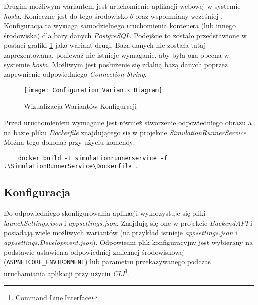 \par Drugim możliwym wariantem jest uruchomienie aplikacji webowej w systemie \emph{host}a. Konieczne jest do tego środowisko \emph{\dotnet{} 6} oraz wspomniany wcześniej \emph{\docker{}}. Konfiguracja ta wymaga samodzielnego uruchomienia kontenera (lub innego środowiska) dla bazy danych \emph{PostgreSQL}. Podejście to zostało przedstawione w postaci grafiki \ref{fig:wizualizacjaWariantowKonfiguracji} jako wariant drugi. Baza danych nie została tutaj zaprezentowana, ponieważ nie istnieje wymaganie, aby była ona obecna w systemie \emph{host}a. Możliwym jest posłużenie się zdalną bazą danych poprzez zapewnienie odpowiedniego \emph{Connection String}.

\begin{figure}[H]
	\texttt{[image: Configuration Variants Diagram]}
	\caption{Wizualizacja Wariantów Konfiguracji}
	\label{fig:wizualizacjaWariantowKonfiguracji}
\end{figure}

\par Przed uruchomieniem wymagane jest również stworzenie odpowiedniego obrazu \emph{\docker{}}a na bazie pliku \emph{Dockerfile} znajdującego się w projekcie \emph{SimulationRunnerService}. Można tego dokonać przy użyciu komendy:

\begin{lstlisting}
	docker build -t simulationrunnerservice -f .\SimulationRunnerService\Dockerfile .
\end{lstlisting}

\subsection{Konfiguracja}
\label{subsec:konfiguracja}

\par Do odpowiedniego skonfigurowania aplikacji wykorzystuje się pliki \emph{launchSettings.json} i \emph{appsettings.json}. Znajdują się one w projekcie \emph{BackendAPI} i posiadają wiele możliwych wariantów (na przykład istnieje \emph{appsettings.json} i \emph{appsettings.Development.json}). Odpowiedni plik konfiguracyjny jest wybierany na podstawie ustawienia odpowiedniej zmiennej środowiskowej (\texttt{ASPNETCORE\_ENVIRONMENT}) lub parametru przekazywanego podczas uruchamiania aplikacji przy użyciu \emph{\dotnet{}} \emph{CLI}\footnote{Command Line Interface}.

\newcommand{\onlyConfiguration}[1]{(dotyczy tylko konfiguracji numer #1 z grafiki \ref{fig:wizualizacjaWariantowKonfiguracji})}


